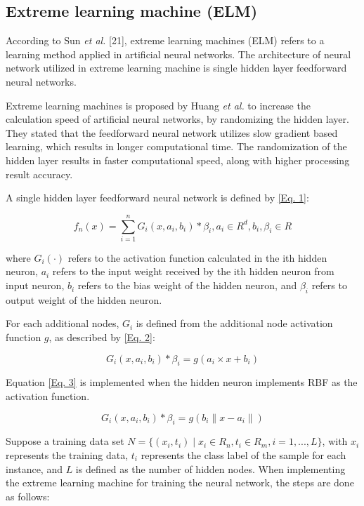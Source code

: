 \documentclass{ws-ijait}
\begin{document}
\subsection{Extreme learning machine (ELM)}
According to Sun \textit{et al.} [21], extreme learning machines (ELM) refers to a learning method applied in artificial neural networks. The architecture of neural network utilized in extreme learning machine is single hidden layer feedforward neural networks.

Extreme learning machines is proposed by Huang \textit{et al.}\cite{12} to increase the calculation speed of artificial neural networks, by randomizing the hidden layer. They stated that the feedforward neural network utilizes slow gradient based learning, which results in longer computational time. The randomization of the hidden layer results in faster computational speed, along with higher processing result accuracy.

A single hidden layer feedforward neural network is defined by \eqref{Eq. 1}:

\begin{equation}
f_{n} (x) = \sum_{i=1}^{n} G_{i} (x, a_{i}, b_{i}) * \beta_{i}, a_{i} \in R^d, b_{i}, \beta_{i} \in R\label{Eq. 1}
\end{equation}

where $G_{i}(\cdot)$ refers to the activation function calculated in the ith hidden neuron, $a_{i}$ refers to the input weight received by the ith hidden neuron from input neuron, $b_{i}$ refers to the bias weight of the hidden neuron, and $\beta_{i}$ refers to output weight of the hidden neuron.

For each additional nodes, $G_{i}$ is defined from the additional node activation function $g$, as described by \eqref{Eq. 2}:

\begin{equation}
G_{i} (x, a_{i}, b_{i}) * \beta_{i} = g(a_{i} \times x + b_{i})\label{Eq. 2}
\end{equation}

Equation \eqref{Eq. 3} is implemented when the hidden neuron implements RBF as the activation function.

\begin{equation}
G_{i}(x, a_{i}, b_{i}) * \beta_{i} = g(b_{i}\parallel x - a_{i} \parallel)\label{Eq. 3}
\end{equation}

Suppose a training data set $ N = \{(x_{i},t_{i}) \mid x_{i} \in R_{n}, t_{i} \in R_{m}, i = 1, ..., L\}$, with $x_{i}$ represents the training data, $t_{i}$ represents the class label of the sample for each instance, and $L$ is defined as the number of hidden nodes. When implementing the extreme learning machine for training the neural network, the steps are done as follows:
\end{document}
